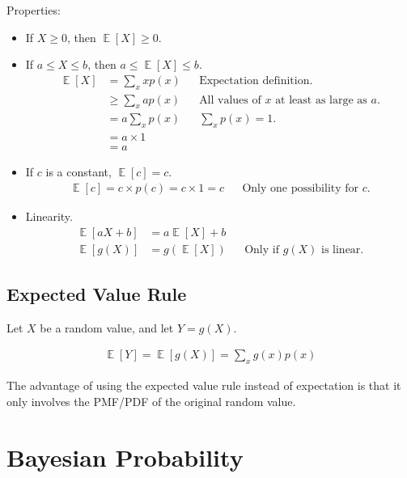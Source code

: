\documentclass{article}
\DeclareMathOperator{\E}{\mathbb{E}}
\begin{document}
Properties:

\begin{itemize}
    \item If $X \geq 0$, then $\E[X] \geq 0$.
    \item If $a \leq X \leq b$, then $a \leq \E[X] \leq b$.
    \begin{align*}
        \E[X] &= \sum_x x p(x) && \text{Expectation definition.} \\
              &\geq \sum_x a p(x) && \text{All values of $x$ at least as large as $a$.} \\
              &= a \sum_x p(x) && \sum_x p(x) = 1. \\
              &= a \times 1 \\
              &= a
    \end{align*}
    \item If $c$ is a constant, $\E[c]=c$.
    \begin{align*}
        \E[c] = c \times p(c) = c \times 1 = c && \text{Only one possibility for $c$.}
    \end{align*}
    \item Linearity.
    \begin{align*}
        \E[aX + b] &= a \E[X] + b \\
        \E[g(X)] &= g(\E[X]) && \text{Only if $g(X)$ is linear.}
    \end{align*}
\end{itemize}

\subsection{Expected Value Rule}

Let $X$ be a random value, and let $Y=g(X)$.

\begin{align*}
    \E[Y] = \E[g(X)] = \sum_x g(x) p(x)
\end{align*}

The advantage of using the expected value rule instead of expectation is that it only involves the PMF/PDF of the original random value.

\section{Bayesian Probability}
\end{document}
